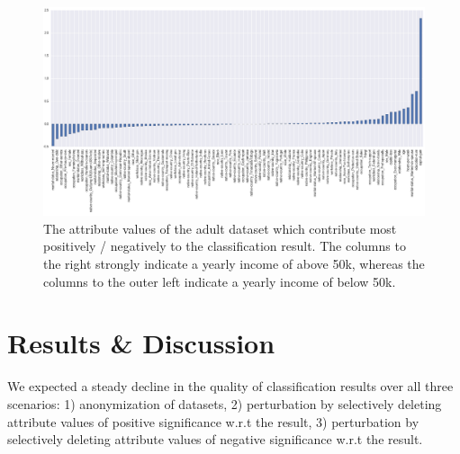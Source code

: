 \documentclass{llncs}
\begin{document}


\begin{figure}[!t]
	\begin{center}
    	\hspace*{-1.5cm}
		\includegraphics[width=1.3\textwidth]{figures/experiment/important_columns}
		\caption{The attribute values of the adult dataset which contribute most positively / negatively to the classification result. The columns to the right strongly indicate a yearly income of above 50k, whereas the columns to the outer left indicate a yearly income of below 50k.}
		\label{fig:adult_important_columns}
	\end{center}
\end{figure}


\section{Results \& Discussion}
\label{sect:results}

We expected a steady decline in the quality of classification results over all three scenarios: 1) anonymization of datasets, 2) perturbation by selectively deleting attribute values of positive significance w.r.t the result, 3) perturbation by selectively deleting attribute values of negative significance w.r.t the result.
\end{document}
